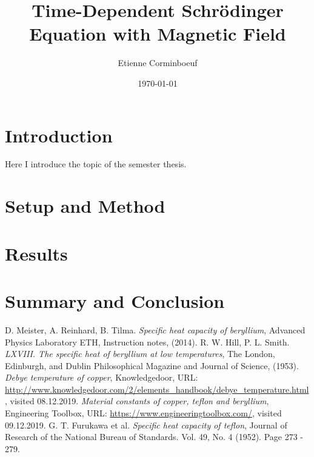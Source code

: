 \documentclass{article}
\title{Time-Dependent Schr{\"o}dinger Equation with Magnetic Field}
\author{Etienne Corminboeuf}
\date{\today}
\begin{document}
\tableofcontents

\section{Introduction}
Here I introduce the topic of the semester thesis.
\section{Setup and Method}

\section{Results}

\section{Summary and Conclusion}


\begin{thebibliography}{9}
  D. Meister, A. Reinhard, B. Tilma.
  \textit{Specific heat capacity of beryllium},
  Advanced Physics Laboratory ETH, Instruction notes, (2014).
  R. W. Hill, P. L. Smith.
  \textit{LXVIII. The specific heat of beryllium at low temperatures},
  The London, Edinburgh, and Dublin Philosophical Magazine and Journal of Science, (1953).
  \textit{Debye temperature of copper},
  Knowledgedoor, URL: \url{http://www.knowledgedoor.com/2/elements_handbook/debye_temperature.html}, visited 08.12.2019.
  \textit{Material constants of copper, teflon and beryllium},
  Engineering Toolbox, URL: \url{https://www.engineeringtoolbox.com/}, visited 09.12.2019.
  G. T. Furukawa et al.
  \textit{Specific heat capacity of teflon},
  Journal of Research of the National Bureau of Standards. Vol. 49, No. 4 (1952). Page 273 - 279.


\end{thebibliography}
\end{document}

